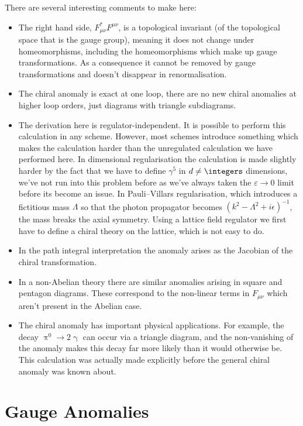 \documentclass[fleqn]{NotesClass}
\newcommand{\Pphoton}{\ensuremath{\upgamma}}
\newcommand{\Ppizero}{\ensuremath{\uppi^{0}}}
\begin{document}
    There are several interesting comments to make here:
    \begin{itemize}
        \item The right hand side, \(F^*_{\mu\nu}F^{\mu\nu}\), is a topological invariant (of the topological space that is the gauge group), meaning it does not change under homeomorphisms, including the homeomorphisms which make up gauge transformations.
        As a consequence it cannot be removed by gauge transformations and doesn't disappear in renormalisation.
        \item The chiral anomaly is exact at one loop, there are no new chiral anomalies at higher loop orders, just diagrams with triangle subdiagrams.
        \item The derivation here is regulator-independent.
        It is possible to perform this calculation in any scheme.
        However, most schemes introduce something which makes the calculation harder than the unregulated calculation we have performed here.
        In dimensional regularisation the calculation is made slightly harder by the fact that we have to define \(\gamma^5\) in \(d \ne \integers\) dimensions, we've not run into this problem before as we've always taken the \(\varepsilon \to 0\) limit before its become an issue.
        In Pauli--Villars regularisation, which introduces a fictitious mass \(\Lambda\) so that the photon propagator becomes \((k^2 - \Lambda^2 + i\epsilon)^{-1}\), the mass breaks the axial symmetry.
        Using a lattice field regulator we first have to define a chiral theory on the lattice, which is not easy to do.
        \item In the path integral interpretation the anomaly arises as the Jacobian of the chiral transformation.
        \item In a non-Abelian theory there are similar anomalies arising in square and pentagon diagrams.
        These correspond to the non-linear terms in \(F_{\mu\nu}\) which aren't present in the Abelian case.
        \item The chiral anomaly has important physical applications.
        For example, the decay \(\Ppizero \to 2\Pphoton\) can occur via a triangle diagram, and the non-vanishing of the anomaly makes this decay far more likely than it would otherwise be.
        This calculation was actually made explicitly before the general chiral anomaly was known about.
    \end{itemize}
    
    \chapter{Gauge Anomalies}
\end{document}
